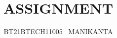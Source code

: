 \documentclass[journal,12pt,twocolumn]{IEEEtran}
\begin{document}
\makeatother
\let\StandardTheFigure\thefigure
\let\vec\mathbf
\renewcommand{\thefigure}{\theproblem}
\def\putbox#1#2#3{\makebox[0in][l]{\makebox[#1][l]{}\raisebox{\baselineskip}[0in][0in]{\raisebox{#2}[0in][0in]{#3}}}}
     \def\rightbox#1{\makebox[0in][r]{#1}}
     \def\centbox#1{\makebox[0in]{#1}}
     \def\topbox#1{\raisebox{-\baselineskip}[0in][0in]{#1}}
     \def\midbox#1{\raisebox{-0.5\baselineskip}[0in][0in]{#1}}
\vspace{3cm}
\title{ASSIGNMENT}
\author{BT21BTECH11005 \ MANIKANTA}
\maketitle
\newpage
\tableofcontents
\bigskip
\renewcommand{\thefigure}{\theenumi}
\renewcommand{\thetable}{\theenumi}
\renewcommand{\theequation}{\theenumi}
\end{document}
